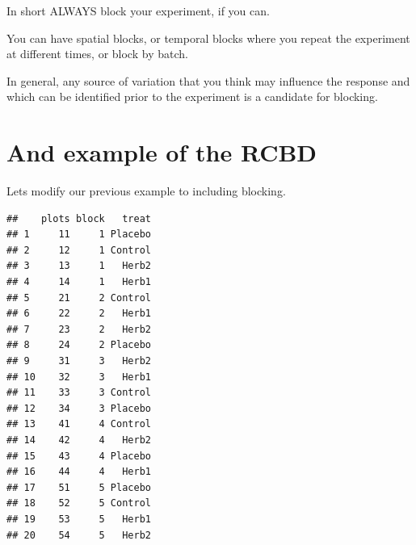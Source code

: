 \documentclass[
]{book}
\newenvironment{Shaded}{\begin{snugshade}}{\end{snugshade}}
\newcommand{\AttributeTok}[1]{\textcolor[rgb]{0.77,0.63,0.00}{#1}}
\newcommand{\CommentTok}[1]{\textcolor[rgb]{0.56,0.35,0.01}{\textit{#1}}}
\newcommand{\DecValTok}[1]{\textcolor[rgb]{0.00,0.00,0.81}{#1}}
\newcommand{\FunctionTok}[1]{\textcolor[rgb]{0.00,0.00,0.00}{#1}}
\newcommand{\NormalTok}[1]{#1}
\newcommand{\OtherTok}[1]{\textcolor[rgb]{0.56,0.35,0.01}{#1}}
\newcommand{\SpecialCharTok}[1]{\textcolor[rgb]{0.00,0.00,0.00}{#1}}
\newcommand{\StringTok}[1]{\textcolor[rgb]{0.31,0.60,0.02}{#1}}
\begin{document}
In short ALWAYS block your experiment, if you can.

You can have spatial blocks, or temporal blocks where you repeat the experiment at different times, or block by batch.

In general, any source of variation that you think may influence the response and which can be identified prior to the experiment is a candidate for blocking.

\hypertarget{and-example-of-the-rcbd}{%
\section{And example of the RCBD}\label{and-example-of-the-rcbd}}

Lets modify our previous example to including blocking.

\begin{Shaded}
\end{Shaded}

\begin{verbatim}
##    plots block   treat
## 1     11     1 Placebo
## 2     12     1 Control
## 3     13     1   Herb2
## 4     14     1   Herb1
## 5     21     2 Control
## 6     22     2   Herb1
## 7     23     2   Herb2
## 8     24     2 Placebo
## 9     31     3   Herb2
## 10    32     3   Herb1
## 11    33     3 Control
## 12    34     3 Placebo
## 13    41     4 Control
## 14    42     4   Herb2
## 15    43     4 Placebo
## 16    44     4   Herb1
## 17    51     5 Placebo
## 18    52     5 Control
## 19    53     5   Herb1
## 20    54     5   Herb2
\end{verbatim}
\end{document}
